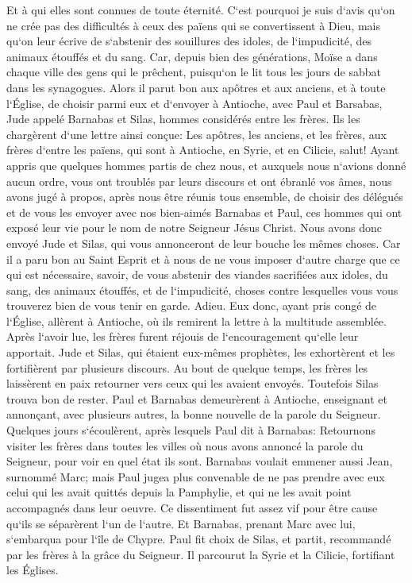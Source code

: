 \verse Et à qui elles sont connues de toute éternité. 
\verse C`est pourquoi je suis d`avis qu`on ne crée pas des difficultés à ceux des païens qui se convertissent à Dieu, 
\verse mais qu`on leur écrive de s`abstenir des souillures des idoles, de l`impudicité, des animaux étouffés et du sang. 
\verse Car, depuis bien des générations, Moïse a dans chaque ville des gens qui le prêchent, puisqu`on le lit tous les jours de sabbat dans les synagogues. 
\verse Alors il parut bon aux apôtres et aux anciens, et à toute l`Église, de choisir parmi eux et d`envoyer à Antioche, avec Paul et Barsabas, Jude appelé Barnabas et Silas, hommes considérés entre les frères. 
\verse Ils les chargèrent d`une lettre ainsi conçue: Les apôtres, les anciens, et les frères, aux frères d`entre les païens, qui sont à Antioche, en Syrie, et en Cilicie, salut! 
\verse Ayant appris que quelques hommes partis de chez nous, et auxquels nous n`avions donné aucun ordre, vous ont troublés par leurs discours et ont ébranlé vos âmes, 
\verse nous avons jugé à propos, après nous être réunis tous ensemble, de choisir des délégués et de vous les envoyer avec nos bien-aimés Barnabas et Paul, 
\verse ces hommes qui ont exposé leur vie pour le nom de notre Seigneur Jésus Christ. 
\verse Nous avons donc envoyé Jude et Silas, qui vous annonceront de leur bouche les mêmes choses. 
\verse Car il a paru bon au Saint Esprit et à nous de ne vous imposer d`autre charge que ce qui est nécessaire, 
\verse savoir, de vous abstenir des viandes sacrifiées aux idoles, du sang, des animaux étouffés, et de l`impudicité, choses contre lesquelles vous vous trouverez bien de vous tenir en garde. Adieu. 
\verse Eux donc, ayant pris congé de l`Église, allèrent à Antioche, où ils remirent la lettre à la multitude assemblée. 
\verse Après l`avoir lue, les frères furent réjouis de l`encouragement qu`elle leur apportait. 
\verse Jude et Silas, qui étaient eux-mêmes prophètes, les exhortèrent et les fortifièrent par plusieurs discours. 
\verse Au bout de quelque temps, les frères les laissèrent en paix retourner vers ceux qui les avaient envoyés. 
\verse Toutefois Silas trouva bon de rester. 
\verse Paul et Barnabas demeurèrent à Antioche, enseignant et annonçant, avec plusieurs autres, la bonne nouvelle de la parole du Seigneur. 
\verse Quelques jours s`écoulèrent, après lesquels Paul dit à Barnabas: Retournons visiter les frères dans toutes les villes où nous avons annoncé la parole du Seigneur, pour voir en quel état ils sont. 
\verse Barnabas voulait emmener aussi Jean, surnommé Marc; 
\verse mais Paul jugea plus convenable de ne pas prendre avec eux celui qui les avait quittés depuis la Pamphylie, et qui ne les avait point accompagnés dans leur oeuvre. 
\verse Ce dissentiment fut assez vif pour être cause qu`ils se séparèrent l`un de l`autre. Et Barnabas, prenant Marc avec lui, s`embarqua pour l`île de Chypre. 
\verse Paul fit choix de Silas, et partit, recommandé par les frères à la grâce du Seigneur. 
\verse Il parcourut la Syrie et la Cilicie, fortifiant les Églises. 

